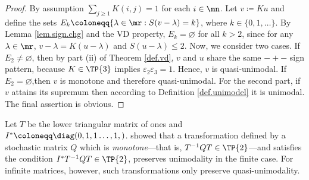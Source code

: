 \documentclass[11pt]{article}
\def\eL{K}
\begin{document}
	\begin{proof}
	 By assumption $ \sum_{j \ge 1} K(i,j) =1$ for each $i \in \mn$.   Let  $v \coloneqq K u$ and  define the sets $E_k \coloneqq \{ \lambda \in \mr: S(v - \lambda)=k \}$, where $k \in \{ 0, 1, \ldots\}$.  By Lemma \ref{lem.sign.chg} and the VD property, $E_k = \varnothing$ for all $k > 2$,  since for any $\lambda \in \mr$,  $v-\lambda = \eL  (u-{\lambda})$ and 	 $S(u-\lambda) \le 2$. Now, we consider two cases. If $E_2\neq \varnothing$, then by part \rm(ii) of Theorem \ref{def.vd}, $v$ and $u$ share the same $-+-$ sign pattern,  because $K \in \TP{3}$ implies  $\varepsilon_2\varepsilon_3=1$. Hence, $v$ is quasi-unimodal. If $E_2= \varnothing$,then $v$ is monotone and therefore quasi-unimodal. 	 For the second part, if $v$ attains its supremum then according to Definition \ref{def.unimodel} it is unimodal. The final assertion is obvious.
	\end{proof}
	

	\begin{rem}
		Let  $T$ be the lower triangular matrix of ones and $I^* \coloneqq \diag(0,1,1\ldots,1,)$.  \cite{KeilsonKester} showed that a transformation defined by a stochastic  matrix $Q$ which is \textit{monotone}---that is, $T^{-1}QT \in \TP{2}$---and satisfies the condition $I^*T^{-1}QT \in \TP{2}$, preserves unimodality in the finite case. For infinite matrices, however, such  transformations only preserve quasi-unimodality.%
	\end{rem}
	
	
	
	
\end{document}
